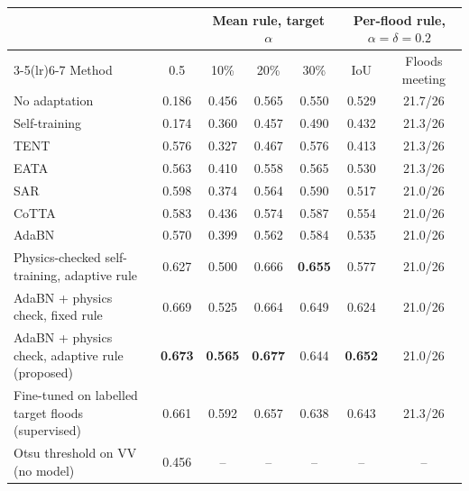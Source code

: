 \begin{tabular}{lcccccc}
\toprule
 & & \multicolumn{3}{c}{Mean rule, target $\alpha$} & \multicolumn{2}{c}{Per-flood rule, $\alpha=\delta=0.2$} \\
\cmidrule(lr){3-5}\cmidrule(lr){6-7}
Method & 0.5 & 10\% & 20\% & 30\% & IoU & Floods meeting \\
\midrule
No adaptation & 0.186 & 0.456 & 0.565 & 0.550 & 0.529 & 21.7/26 \\
Self-training \citep{chen2026cimttda} & 0.174 & 0.360 & 0.457 & 0.490 & 0.432 & 21.3/26 \\
TENT & 0.576 & 0.327 & 0.467 & 0.576 & 0.413 & 21.3/26 \\
EATA & 0.563 & 0.410 & 0.558 & 0.565 & 0.530 & 21.3/26 \\
SAR & 0.598 & 0.374 & 0.564 & 0.590 & 0.517 & 21.0/26 \\
CoTTA & 0.583 & 0.436 & 0.574 & 0.587 & 0.554 & 21.0/26 \\
AdaBN & 0.570 & 0.399 & 0.562 & 0.584 & 0.535 & 21.0/26 \\
Physics-checked self-training, adaptive rule & 0.627 & 0.500 & 0.666 & \textbf{0.655} & 0.577 & 21.0/26 \\
AdaBN + physics check, fixed rule & 0.669 & 0.525 & 0.664 & 0.649 & 0.624 & 21.0/26 \\
AdaBN + physics check, adaptive rule (proposed) & \textbf{0.673} & \textbf{0.565} & \textbf{0.677} & 0.644 & \textbf{0.652} & 21.0/26 \\
\midrule
Fine-tuned on labelled target floods (supervised) & 0.661 & 0.592 & 0.657 & 0.638 & 0.643 & 21.3/26 \\
\midrule
Otsu threshold on VV (no model) & 0.456 & -- & -- & -- & -- & -- \\
\bottomrule
\end{tabular}
